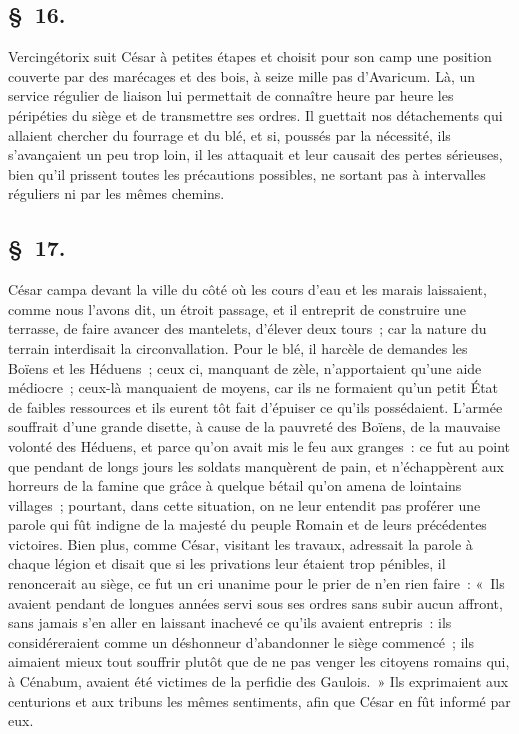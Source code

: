\documentclass[french,twoside]{book} %
\begin{document}
\subsection[{§ 16.}]{ \textsc{§ 16.} }
\noindent Vercingétorix suit César à petites étapes et choisit pour son camp une position couverte par des marécages et des bois, à seize mille pas d’Avaricum. Là, un service régulier de liaison lui permettait de connaître heure par heure les péripéties du siège et de transmettre ses ordres. Il guettait nos détachements qui allaient chercher du fourrage et du blé, et si, poussés par la nécessité, ils s’avançaient un peu trop loin, il les attaquait et leur causait des pertes sérieuses, bien qu’il prissent toutes les précautions possibles, ne sortant pas à intervalles réguliers ni par les mêmes chemins.
\subsection[{§ 17.}]{ \textsc{§ 17.} }
\noindent César campa devant la ville du côté où les cours d’eau et les marais laissaient, comme nous l’avons dit, un étroit passage, et il entreprit de construire une terrasse, de faire avancer des mantelets, d’élever deux tours ; car la nature du terrain interdisait la circonvallation. Pour le blé, il harcèle de demandes les Boïens et les Héduens ; ceux ci, manquant de zèle, n’apportaient qu’une aide médiocre ; ceux-là manquaient de moyens, car ils ne formaient qu’un petit État de faibles ressources et ils eurent tôt fait d’épuiser ce qu’ils possédaient. L'armée souffrait d’une grande disette, à cause de la pauvreté des Boïens, de la mauvaise volonté des Héduens, et parce qu’on avait mis le feu aux granges : ce fut au point que pendant de longs jours les soldats manquèrent de pain, et n’échappèrent aux horreurs de la famine que grâce à quelque bétail qu’on amena de lointains villages ; pourtant, dans cette situation, on ne leur entendit pas proférer une parole qui fût indigne de la majesté du peuple Romain et de leurs précédentes victoires. Bien plus, comme César, visitant les travaux, adressait la parole à chaque légion et disait que si les privations leur étaient trop pénibles, il renoncerait au siège, ce fut un cri unanime pour le prier de n’en rien faire : « Ils avaient pendant de longues années servi sous ses ordres sans subir aucun affront, sans jamais s’en aller en laissant inachevé ce qu’ils avaient entrepris : ils considéreraient comme un déshonneur d’abandonner le siège commencé ; ils aimaient mieux tout souffrir plutôt que de ne pas venger les citoyens romains qui, à Cénabum, avaient été victimes de la perfidie des Gaulois. » Ils exprimaient aux centurions et aux tribuns les mêmes sentiments, afin que César en fût informé par eux.
\end{document}
